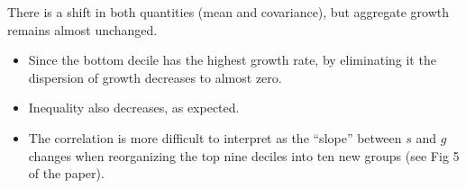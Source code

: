 \documentclass{article}
\begin{document}
There is a shift in both quantities (mean and covariance), but aggregate growth remains almost unchanged.

\begin{figure}[H]
  \centering
  \hfill
  \caption*{}
\end{figure}

\begin{itemize}
\item Since the bottom decile has the highest growth rate, by eliminating it the dispersion of growth decreases to almost zero. 
\item Inequality also decreases, as expected. 
\item The correlation is more difficult to interpret as the ``slope'' between $s$ and $g$ changes when reorganizing the top nine deciles into ten new groups (see Fig 5 of the paper).
\end{itemize}
\end{document}
